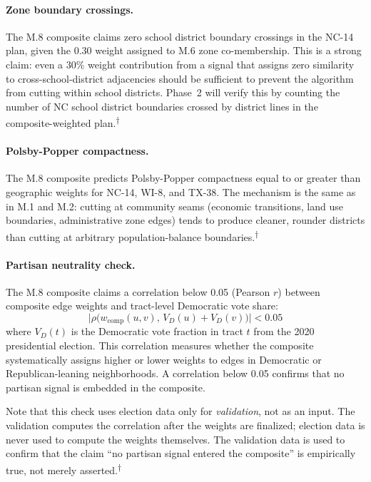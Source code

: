 \paragraph{Zone boundary crossings.}
The M.8 composite claims zero school district boundary crossings in the
NC-14 plan, given the 0.30 weight assigned to M.6 zone co-membership.
This is a strong claim: even a 30\% weight contribution from a signal that
assigns zero similarity to cross-school-district adjacencies should be
sufficient to prevent the algorithm from cutting within school districts.
Phase~2 will verify this by counting the number of NC school district
boundaries crossed by district lines in the composite-weighted plan.\textsuperscript{$\dagger$}

\paragraph{Polsby-Popper compactness.}
The M.8 composite predicts Polsby-Popper compactness equal to or greater
than geographic weights for NC-14, WI-8, and TX-38.
The mechanism is the same as in M.1 and M.2: cutting at community seams
(economic transitions, land use boundaries, administrative zone edges)
tends to produce cleaner, rounder districts than cutting at arbitrary
population-balance boundaries.\textsuperscript{$\dagger$}

\paragraph{Partisan neutrality check.}
The M.8 composite claims a correlation below 0.05 (Pearson $r$) between
composite edge weights and tract-level Democratic vote share:
\begin{equation}
  \bigl|\rho\bigl(w_{\mathrm{comp}}(u,v),\, V_D(u) + V_D(v)\bigr)\bigr| < 0.05
  \label{eq:partisan-check}
\end{equation}
where $V_D(t)$ is the Democratic vote fraction in tract $t$ from the 2020
presidential election.
This correlation measures whether the composite systematically assigns
higher or lower weights to edges in Democratic or Republican-leaning
neighborhoods.
A correlation below 0.05 confirms that no partisan signal is embedded
in the composite.

Note that this check uses election data only for \emph{validation}, not
as an input.
The validation computes the correlation after the weights are finalized;
election data is never used to compute the weights themselves.
The validation data is used to confirm that the claim ``no partisan signal
entered the composite'' is empirically true, not merely asserted.\textsuperscript{$\dagger$}

